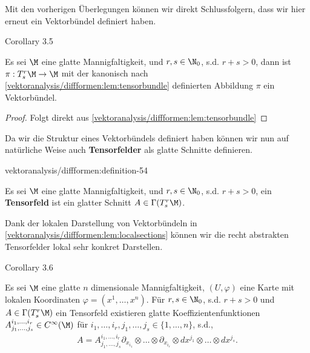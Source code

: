 \documentclass[letterpaper,10pt,english]{jupyterBook}
\begin{document}
\par
Mit den vorherigen Überlegungen können wir direkt Schlussfolgern, dass wir hier erneut ein Vektorbündel definiert haben.
\label{vektoranalysis/diffformen:corollary-53}
\begin{emphBox}{}{}{Corollary 3.5}



\par
Es sei \(\M\) eine glatte Mannigfaltigkeit, und \(r,s\in\N_0\), s.d. \(r+s>0\), dann ist \(\pi:T^r_s\M\to\M\) mit der kanonisch nach \cref{vektoranalysis/diffformen:lem:tensorbundle} definierten Abbildung \(\pi\) ein Vektorbündel.
\end{emphBox}

\begin{proof}
 Folgt direkt aus \cref{vektoranalysis/diffformen:lem:tensorbundle} 
\end{proof}

\par
Da wir die Struktur eines Vektorbündels definiert haben können wir nun auf natürliche Weise auch \textbf{Tensorfelder} als glatte Schnitte definieren.
\begin{definition}{}{vektoranalysis/diffformen:definition-54}



\par
Es sei \(\M\) eine glatte Mannigfaltigkeit, und \(r,s\in\N_0\), s.d. \(r+s>0\), ein \textbf{Tensorfeld} ist ein glatter Schnitt \(A\in \Gamma(T^r_s\M)\).
\end{definition}

\par
Dank der lokalen Darstellung von Vektorbündeln in \cref{vektoranalysis/diffformen:lem:localsections} können wir die recht abstrakten Tensorfelder lokal sehr konkret Darstellen.
\label{vektoranalysis/diffformen:corollary-55}
\begin{emphBox}{}{}{Corollary 3.6}



\par
Es sei \(\M\) eine glatte \(n\) dimensionale Mannigfaltigkeit, \((U,\varphi)\) eine Karte mit lokalen Koordinaten \(\varphi=(x^1,\ldots,x^n)\). Für \(r,s\in\N_0\), s.d. \(r+s>0\) und \(A\in \Gamma(T^r_s\M)\) ein Tensorfeld existieren glatte Koeffizientenfunktionen \(A^{i_1,\ldots, i_r}_{j_1,\ldots,j_s}\in C^\infty(\M)\) für \(i_1,\ldots, i_r, j_1,\ldots, j_s\in \{1,\ldots,n\}\), s.d.,
\begin{align*}
A = A^{i_1,\ldots,i_r}_{j_1,\ldots,j_s} \partial_{x_{i_1}}\otimes\ldots\otimes \partial_{x_{i_r}}\otimes dx^{j_1}\otimes\ldots\otimes dx^{j_s}.
\end{align*}\end{emphBox}
\end{document}

